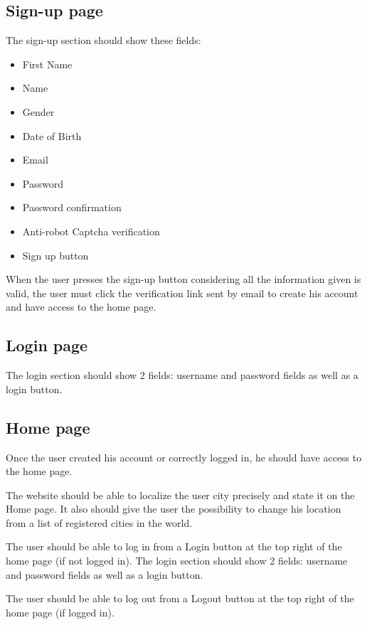 \documentclass[conference]{IEEEtran}
\begin{document}
\subsection{Sign-up page}

The sign-up section should show these fields:

\begin{itemize}
    \item First Name
    \item Name
    \item Gender
    \item Date of Birth
    \item Email
    \item Password
    \item Password confirmation
    \item Anti-robot Captcha verification
    \item Sign up button
\end{itemize}

When the user presses the sign-up button considering all
the information given is valid, the user must click the verification link sent by email to create his account and have access to the home page.

\subsection{Login page}

The login section should show 2 fields: username and password fields as well as a login button.

\subsection{Home page}

Once the user created his account or correctly logged in, he should have access to the home page.

The website should be able to localize the user city precisely and state it on the Home page. It also should give the user the possibility to change his location from a list of registered cities in the world.

The user should be able to log in from a Login button at the top right of the home page (if not logged in). The login section should show 2 fields: username and password fields as well as a login button.

The user should be able to log out from a Logout button at the top right of the home page (if logged in).
\end{document}
